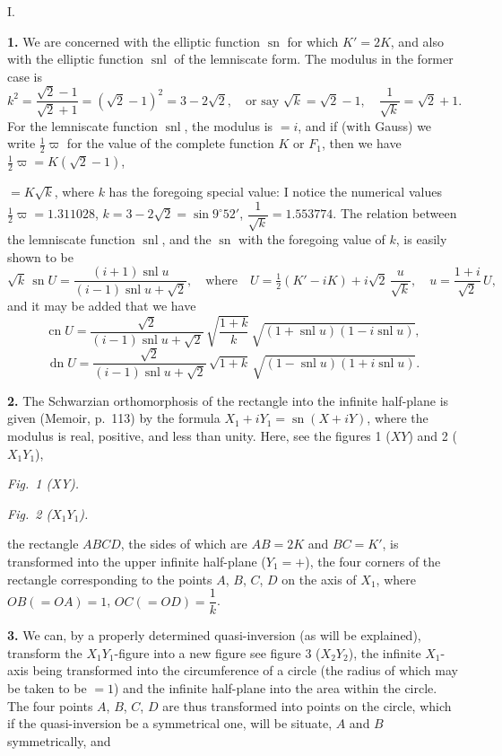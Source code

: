 \documentclass[11pt,a4paper]{article}
\providecommand{\sn}{\operatorname{sn}}
\providecommand{\cn}{\operatorname{cn}}
\providecommand{\dn}{\operatorname{dn}}
\providecommand{\snl}{\operatorname{snl}}
\begin{document}
\begin{center}\textsc{I.}\end{center}

\textbf{1.} We are concerned with the elliptic function $\sn$ for which $K' = 2K$, and also with the elliptic function $\snl$ of the lemniscate form. The modulus in the former case is
\[
k^2 = \frac{\sqrt{2} - 1}{\sqrt{2} + 1} = (\sqrt{2} - 1)^2 = 3 - 2\sqrt{2}, \quad \text{or say } \sqrt{k} = \sqrt{2} - 1, \quad \frac{1}{\sqrt{k}} = \sqrt{2} + 1.
\]
For the lemniscate function $\snl$, the modulus is $= i$, and if (with Gauss) we write $\tfrac{1}{2}\varpi$ for the value of the complete function $K$ or $F_1$, then we have $\tfrac{1}{2}\varpi = K(\sqrt{2} - 1)$,

$= K\sqrt{k}$, where $k$ has the foregoing special value: I notice the numerical values $\tfrac{1}{2}\varpi = 1.311028$, $k = 3 - 2\sqrt{2} = \sin 9^\circ 52'$, $\dfrac{1}{\sqrt{k}} = 1.553774$. The relation between the lemniscate function $\snl$, and the $\sn$ with the foregoing value of $k$, is easily shown to be
\[
\sqrt{k}\,\sn U = \frac{(i + 1)\snl u}{(i - 1)\snl u + \sqrt{2}}, \quad \text{where} \quad U = \tfrac{1}{2}(K' - i K) + i\sqrt{2}\,\frac{u}{\sqrt{k}}, \quad u = \frac{1 + i}{\sqrt{2}}\,U,
\]
and it may be added that we have
\[
\cn U = \frac{\sqrt{2}}{(i - 1)\snl u + \sqrt{2}}\,\sqrt{\frac{1 + k}{k}}\,\sqrt{(1 + \snl u)(1 - i\snl u)},
\]
\[
\dn U = \frac{\sqrt{2}}{(i - 1)\snl u + \sqrt{2}}\,\sqrt{1 + k}\,\sqrt{(1 - \snl u)(1 + i\snl u)}.
\]

\textbf{2.} The Schwarzian orthomorphosis of the rectangle into the infinite half-plane is given (Memoir, p.~113) by the formula $X_1 + i Y_1 = \sn(X + iY)$, where the modulus is real, positive, and less than unity. Here, see the figures 1 ($XY$) and 2 ($X_1 Y_1$),
\begin{center}\textit{Fig.\ 1 (XY).}\end{center}
\begin{center}\textit{Fig.\ 2 (}$X_1 Y_1$\textit{).}\end{center}
the rectangle $ABCD$, the sides of which are $AB = 2K$ and $BC = K'$, is transformed into the upper infinite half-plane ($Y_1 = +$), the four corners of the rectangle corresponding to the points $A$, $B$, $C$, $D$ on the axis of $X_1$, where $OB (= OA) = 1$, $OC (= OD) = \dfrac{1}{k}$.

\textbf{3.} We can, by a properly determined quasi-inversion (as will be explained), transform the $X_1 Y_1$-figure into a new figure see figure 3 ($X_2 Y_2$), the infinite $X_1$-axis being transformed into the circumference of a circle (the radius of which may be taken to be $= 1$) and the infinite half-plane into the area within the circle. The four points $A$, $B$, $C$, $D$ are thus transformed into points on the circle, which if the quasi-inversion be a symmetrical one, will be situate, $A$ and $B$ symmetrically, and
\end{document}
